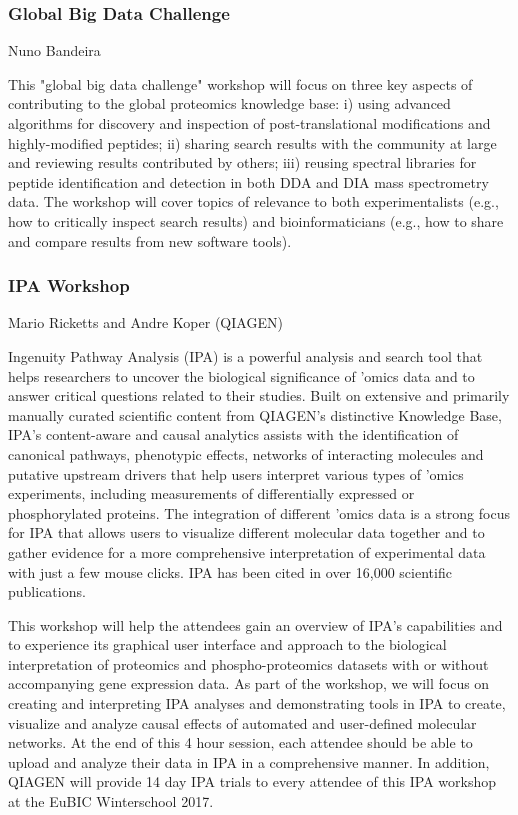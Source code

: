 \subsubsection*{\color{eubicRed} Global Big Data Challenge}
{\color{eubicGray} Nuno Bandeira}

This "global big data challenge" workshop will focus on three key aspects of
contributing to the global proteomics knowledge base: i) using advanced
algorithms for discovery and inspection of post-translational modifications and
highly-modified peptides; ii) sharing search results with the community at large
and reviewing results contributed by others; iii) reusing spectral libraries for
peptide identification and detection in both DDA and DIA mass spectrometry data.
The workshop will cover topics of relevance to both experimentalists (e.g., how
to critically inspect search results) and bioinformaticians (e.g., how to share
and compare results from new software tools).


\subsubsection*{\color{eubicRed} IPA Workshop}
{\color{eubicGray} Mario Ricketts and Andre Koper (QIAGEN)}

Ingenuity\textregistered{} Pathway Analysis (IPA\textregistered{}) is a powerful
analysis and search tool that helps researchers to uncover the biological
significance of 'omics data and to answer critical questions related to their
studies. Built on extensive and primarily manually curated scientific content
from QIAGEN's distinctive Knowledge Base, IPA's content-aware and causal
analytics assists with the identification of canonical pathways, phenotypic
effects, networks of interacting molecules and putative upstream drivers that
help users interpret various types of 'omics experiments, including measurements
of differentially expressed or phosphorylated proteins. The integration of
different 'omics data is a strong focus for IPA that allows users to visualize
different molecular data together and to gather evidence for a more
comprehensive interpretation of experimental data with just a few mouse clicks.
IPA has been cited in over 16,000 scientific publications.

This workshop will help the attendees gain an overview of IPA's capabilities and
to experience its graphical user interface and approach to the biological
interpretation of proteomics and phospho-proteomics datasets with or without
accompanying gene expression data. As part of the workshop, we will focus on
creating and interpreting IPA analyses and demonstrating tools in IPA to create,
visualize and analyze causal effects of automated and user-defined molecular
networks. At the end of this 4 hour session, each attendee should be able to
upload and analyze their data in IPA in a comprehensive manner.  In addition,
QIAGEN will provide 14 day IPA trials to every attendee of this IPA workshop at
the EuBIC Winterschool 2017.


